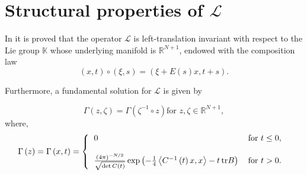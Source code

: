 \documentclass[10pt]{amsart}
\def\elle{\mathcal{L}}
\numberwithin{equation}{section}
\begin{document}
  



\section{Structural properties of $\elle$} \label{operatori} 


In \cite[Section 1]{LP} it is proved that the operator $\elle$ is left-translation invariant with respect to the Lie group $\mathbb {K}$ whose underlying manifold is $\mathbb{R}^{N+1}$, endowed with the composition law
$$\left(  x,t\right)  \circ\left(  \xi,s\right)  =\left(  \xi+E(s)  x,t+ s \right).$$

Furthermore, a fundamental solution for $\elle$ is given by   

\[
\Gamma\left(  z,\zeta\right)  =\Gamma \left(  \zeta^{-1}\circ z\right)  \text{
for }z,\zeta\in\mathbb{R}^{N+1},
\]
where, 
\begin{equation}
\Gamma \left(z \right)  =\Gamma \left(x,t\right)  =\left\{
\begin{tabular}
[c]{lll}
$0$ & $\text{for }t\leq0,$\\\mbox{}\\
$\frac{\left(  4\pi\right)  ^{-N/2}}{\sqrt{\det C\left(  t\right)  }}
\exp\left(  -\frac{1}{4}\left\langle C^{-1}\left(  t\right)  x,x\right\rangle - t \, \mathrm{tr} B
\right)  $ & $\text{for }t>0.$
\end{tabular}
\ \right. \nonumber
\end{equation}
\end{document}
